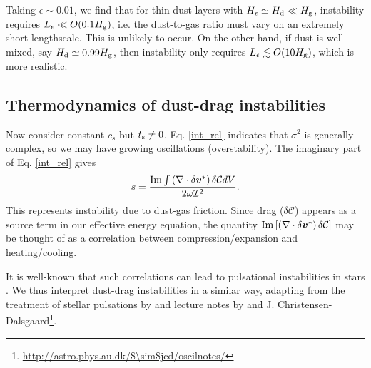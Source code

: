 Taking $\epsilon\sim 0.01$,  we find that 
for thin dust layers with $H_\epsilon \simeq H_\mathrm{d}\ll H_\mathrm{g}$,  instability
requires $L_\epsilon\ll O(0.1H_\mathrm{g})$, i.e. the dust-to-gas ratio must
vary on an extremely short lengthscale. 
This is unlikely to
occur. On the other hand, if dust is well-mixed, say $H_\mathrm{d}\simeq
0.99H_\mathrm{g}$, then instability only requires 
$L_\epsilon\lesssim O(10H_\mathrm{g})$, which is more realistic. 


\subsection{Thermodynamics of dust-drag instabilities}\label{dust_work}
Now consider constant $c_s$ but $t_\mathrm{s}\neq0$. 
Eq. \ref{int_rel} indicates that $\sigma^2$ is generally complex, so
we may have growing oscillations (overstability). %
The imaginary part of Eq. \ref{int_rel}
gives  
\begin{align}
  s = \frac{\operatorname{Im}\int \left(\nabla\cdot\delta\bm{v}^*\right)\delta\mathcal{C}dV}{2\omega\mathcal{I}^2}. \label{thermal_instability}
\end{align} 
This represents instability due to dust-gas friction. 
Since drag ($\delta \mathcal{C}$) appears as a source term in our
effective energy equation, the quantity 
$\operatorname{Im}\left[\left(\nabla\cdot\delta\bm{v}^*\right)\delta\mathcal{C}\right]$
may be thought of as a correlation between compression/expansion and  
heating/cooling.  

It is well-known that such correlations can lead to pulsational
instabilities in stars \citep{cox67}. We thus interpret  
dust-drag instabilities in a similar way, 
adapting from the treatment of stellar 
pulsations by \cite{cox67} and lecture notes by \cite{samadi15} and 
J. Christensen-Dalsgaard\footnote{\url{http://astro.phys.au.dk/$\sim$jcd/oscilnotes/}}.      

